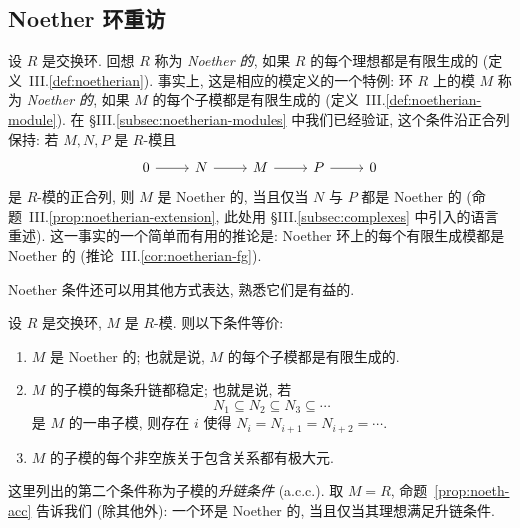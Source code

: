 \subsection{Noether 环重访}
\label{subsec:noetherian-rings-revisited}

设 $R$ 是交换环. 回想 $R$ 称为 \emph{Noether 的}, 如果 $R$ 的每个理想都是有限生成的 (定义~III.\ref{def:noetherian}). 事实上, 这是相应的模定义的一个特例: 环 $R$ 上的模 $M$ 称为 \emph{Noether 的}, 如果 $M$ 的每个子模都是有限生成的 (定义~III.\ref{def:noetherian-module}). 在 §III.\ref{subsec:noetherian-modules} 中我们已经验证, 这个条件沿正合列保持: 若 $M,N,P$ 是 $R$-模且
\[
\begin{tikzcd}
0 \ar[r] & N \ar[r] & M \ar[r] & P \ar[r] & 0
\end{tikzcd}
\]
是 $R$-模的正合列, 则 $M$ 是 Noether 的, 当且仅当 $N$ 与 $P$ 都是 Noether 的 (命题~III.\ref{prop:noetherian-extension}, 此处用 \S III.\ref{subsec:complexes} 中引入的语言重述). 这一事实的一个简单而有用的推论是: Noether 环上的每个有限生成模都是 Noether 的 (推论~III.\ref{cor:noetherian-fg}).

Noether 条件还可以用其他方式表达, 熟悉它们是有益的.

\begin{proposition}\label{prop:noeth-acc}
设 $R$ 是交换环, $M$ 是 $R$-模. 则以下条件等价:
\begin{enumerate}[label=(\arabic*)]
\item $M$ 是 Noether 的; 也就是说, $M$ 的每个子模都是有限生成的.
\item $M$ 的子模的每条升链都稳定; 也就是说, 若
\[
N_1 \subseteq N_2 \subseteq N_3 \subseteq \cdots
\]
是 $M$ 的一串子模, 则存在 $i$ 使得 $N_i = N_{i+1} = N_{i+2} = \cdots$.
\item $M$ 的子模的每个非空族关于包含关系都有极大元.
\end{enumerate}
这里列出的第二个条件称为子模的\emph{升链条件} (a.c.c.). 取 $M = R$, 命题~\ref{prop:noeth-acc} 告诉我们 (除其他外): 一个环是 Noether 的, 当且仅当其理想满足升链条件.
\end{proposition}

